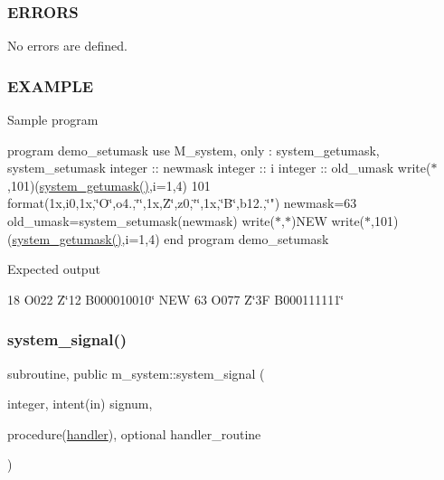 \subsubsection*{E\+R\+R\+O\+RS}

No errors are defined.

\subsubsection*{E\+X\+A\+M\+P\+LE}

Sample program

program demo\+\_\+setumask use M\+\_\+system, only \+: system\+\_\+getumask, system\+\_\+setumask integer \+:\+: newmask integer \+:\+: i integer \+:\+: old\+\_\+umask write($\ast$,101)(\mbox{\hyperlink{namespacem__system_aa9ca951be39d2ea738d627cf42c00ddd}{system\+\_\+getumask()}},i=1,4) 101 format(1x,i0,1x,\char`\"{}\+O\textquotesingle{}\char`\"{},o4.,\char`\"{}\textquotesingle{}\char`\"{},1x,\textquotesingle{}Z\char`\"{}\textquotesingle{},z0,\char`\"{}\textquotesingle{}\char`\"{},1x,\char`\"{}B\textquotesingle{}\char`\"{},b12.,\char`\"{}\textquotesingle{}") newmask=63 old\+\_\+umask=system\+\_\+setumask(newmask) write($\ast$,$\ast$)\textquotesingle{}N\+EW\textquotesingle{} write($\ast$,101)(\mbox{\hyperlink{namespacem__system_aa9ca951be39d2ea738d627cf42c00ddd}{system\+\_\+getumask()}},i=1,4) end program demo\+\_\+setumask

Expected output

18 O\textquotesingle{}022\textquotesingle{} Z\char`\"{}12\textquotesingle{} B\textquotesingle{}000010010\char`\"{} N\+EW 63 O\textquotesingle{}077\textquotesingle{} Z\char`\"{}3\+F\textquotesingle{} B\textquotesingle{}000111111\char`\"{} \mbox{\label{namespacem__system_a4a70cade424b9763dedd8cb8c0059e8c}} 
\subsubsection{\texorpdfstring{system\+\_\+signal()}{system\_signal()}}
{\footnotesize\ttfamily subroutine, public m\+\_\+system\+::system\+\_\+signal (\begin{DoxyParamCaption}\item[{integer, intent(in)}]{signum,  }\item[{procedure(\mbox{\hyperlink{interfacem__system_1_1handler}{handler}}), optional}]{handler\+\_\+routine }\end{DoxyParamCaption})}



